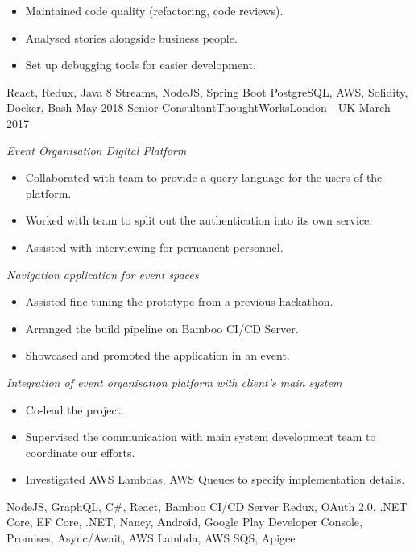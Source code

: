\begin{experiences}
{\begin{itemize}
          \item Maintained code quality (refactoring, code reviews).
          \item Analysed stories alongside business people.
          \item Set up debugging tools for easier development.
        \end{itemize}
      }
      {React, Redux, Java 8 Streams, NodeJS, Spring Boot}
      {PostgreSQL, AWS, Solidity, Docker, Bash}
    \emptySeparator
    \experience
      {May 2018}
      {Senior Consultant}{ThoughtWorks}{London - UK}
      {March 2017}
      {
        \emph{Event Organisation Digital Platform}
        \begin{itemize}
          \item Collaborated with team to provide a query language for the users of the platform.
          \item Worked with team to split out the authentication into its own service.
          \item Assisted with interviewing for permanent personnel.
        \end{itemize}

        \emph{Navigation application for event spaces}
        \begin{itemize}
          \item Assisted fine tuning the prototype from a previous hackathon.
          \item Arranged the build pipeline on Bamboo CI/CD Server.
          \item Showcased and promoted the application in an event.
        \end{itemize}

        \emph{Integration of event organisation platform with client's main system}
        \begin{itemize}
          \item Co-lead the project.
          \item Supervised the communication with main system development team to coordinate our efforts.
          \item Investigated AWS Lambdas, AWS Queues to specify implementation details.
        \end{itemize}
      }
      {NodeJS, GraphQL, C\#, React, Bamboo CI/CD Server}
      {Redux, OAuth 2.0, .NET Core, EF Core, .NET, Nancy, Android, Google Play Developer Console, Promises, Async/Await, AWS Lambda, AWS SQS, Apigee}
    \emptySeparator


\end{experiences}
